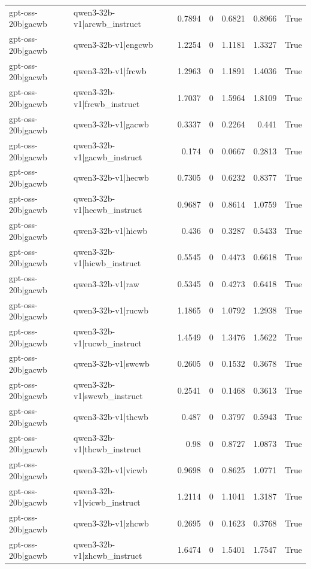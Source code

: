 \begin{table}
\begin{tabular}{l l r r r r l}
gpt-oss-20b|gacwb & qwen3-32b-v1|arcwb_instruct & 0.7894 & 0 & 0.6821 & 0.8966 & True \\
gpt-oss-20b|gacwb & qwen3-32b-v1|engcwb & 1.2254 & 0 & 1.1181 & 1.3327 & True \\
gpt-oss-20b|gacwb & qwen3-32b-v1|frcwb & 1.2963 & 0 & 1.1891 & 1.4036 & True \\
gpt-oss-20b|gacwb & qwen3-32b-v1|frcwb_instruct & 1.7037 & 0 & 1.5964 & 1.8109 & True \\
gpt-oss-20b|gacwb & qwen3-32b-v1|gacwb & 0.3337 & 0 & 0.2264 & 0.441 & True \\
gpt-oss-20b|gacwb & qwen3-32b-v1|gacwb_instruct & 0.174 & 0 & 0.0667 & 0.2813 & True \\
gpt-oss-20b|gacwb & qwen3-32b-v1|hecwb & 0.7305 & 0 & 0.6232 & 0.8377 & True \\
gpt-oss-20b|gacwb & qwen3-32b-v1|hecwb_instruct & 0.9687 & 0 & 0.8614 & 1.0759 & True \\
gpt-oss-20b|gacwb & qwen3-32b-v1|hicwb & 0.436 & 0 & 0.3287 & 0.5433 & True \\
gpt-oss-20b|gacwb & qwen3-32b-v1|hicwb_instruct & 0.5545 & 0 & 0.4473 & 0.6618 & True \\
gpt-oss-20b|gacwb & qwen3-32b-v1|raw & 0.5345 & 0 & 0.4273 & 0.6418 & True \\
gpt-oss-20b|gacwb & qwen3-32b-v1|rucwb & 1.1865 & 0 & 1.0792 & 1.2938 & True \\
gpt-oss-20b|gacwb & qwen3-32b-v1|rucwb_instruct & 1.4549 & 0 & 1.3476 & 1.5622 & True \\
gpt-oss-20b|gacwb & qwen3-32b-v1|swcwb & 0.2605 & 0 & 0.1532 & 0.3678 & True \\
gpt-oss-20b|gacwb & qwen3-32b-v1|swcwb_instruct & 0.2541 & 0 & 0.1468 & 0.3613 & True \\
gpt-oss-20b|gacwb & qwen3-32b-v1|thcwb & 0.487 & 0 & 0.3797 & 0.5943 & True \\
gpt-oss-20b|gacwb & qwen3-32b-v1|thcwb_instruct & 0.98 & 0 & 0.8727 & 1.0873 & True \\
gpt-oss-20b|gacwb & qwen3-32b-v1|vicwb & 0.9698 & 0 & 0.8625 & 1.0771 & True \\
gpt-oss-20b|gacwb & qwen3-32b-v1|vicwb_instruct & 1.2114 & 0 & 1.1041 & 1.3187 & True \\
gpt-oss-20b|gacwb & qwen3-32b-v1|zhcwb & 0.2695 & 0 & 0.1623 & 0.3768 & True \\
gpt-oss-20b|gacwb & qwen3-32b-v1|zhcwb_instruct & 1.6474 & 0 & 1.5401 & 1.7547 & True \\

\end{tabular}
\end{table}
